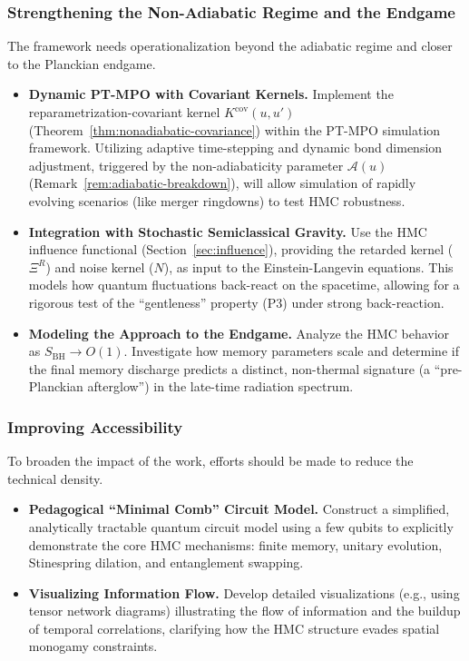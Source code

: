 \documentclass[aps,prd,preprint,onecolumn,superscriptaddress,nofootinbib,longbibliography,floatfix,11pt,showpacs,showkeys]{revtex4-2}
\theoremstyle{plain}
\theoremstyle{definition}
\theoremstyle{remark}
\begin{document}
\subsubsection{Strengthening the Non-Adiabatic Regime and the Endgame}
The framework needs operationalization beyond the adiabatic regime and closer to the Planckian endgame.
\begin{itemize}
    \item \textbf{Dynamic PT-MPO with Covariant Kernels.} Implement the reparametrization-covariant kernel $K^{\mathrm{cov}}(u,u')$ (Theorem~\ref{thm:nonadiabatic-covariance}) within the PT-MPO simulation framework. Utilizing adaptive time-stepping and dynamic bond dimension adjustment, triggered by the non-adiabaticity parameter $\mathcal{A}(u)$ (Remark~\ref{rem:adiabatic-breakdown}), will allow simulation of rapidly evolving scenarios (like merger ringdowns) to test HMC robustness.
    \item \textbf{Integration with Stochastic Semiclassical Gravity.} Use the HMC influence functional (Section~\ref{sec:influence}), providing the retarded kernel ($\Xi^R$) and noise kernel ($N$), as input to the Einstein-Langevin equations. This models how quantum fluctuations back-react on the spacetime, allowing for a rigorous test of the ``gentleness'' property (P3) under strong back-reaction.
    \item \textbf{Modeling the Approach to the Endgame.} Analyze the HMC behavior as $S_{\mathrm{BH}} \to O(1)$. Investigate how memory parameters scale and determine if the final memory discharge predicts a distinct, non-thermal signature (a ``pre-Planckian afterglow'') in the late-time radiation spectrum.
\end{itemize}

\subsubsection{Improving Accessibility}
To broaden the impact of the work, efforts should be made to reduce the technical density.
\begin{itemize}
    \item \textbf{Pedagogical ``Minimal Comb'' Circuit Model.} Construct a simplified, analytically tractable quantum circuit model using a few qubits to explicitly demonstrate the core HMC mechanisms: finite memory, unitary evolution, Stinespring dilation, and entanglement swapping.
    \item \textbf{Visualizing Information Flow.} Develop detailed visualizations (e.g., using tensor network diagrams) illustrating the flow of information and the buildup of temporal correlations, clarifying how the HMC structure evades spatial monogamy constraints.
\end{itemize}
\end{document}
